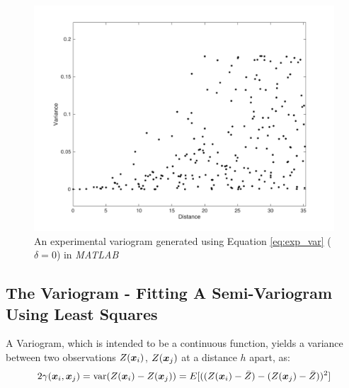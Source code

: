 \documentclass[11pt]{ucthesis}
\newcommand{\vect}[1]{{\it{\boldsymbol{#1}}}}
\begin{document}
\begin{figure}[H]
    \centering    
	\includegraphics[width=\linewidth]{figures/exp_variogram.png}
	\captionsetup{skip=0.5\baselineskip,size=footnotesize}
	\caption{An experimental variogram generated using Equation \ref{eq:exp_var} ($\delta=0$) in \textit{MATLAB}}
	\label{fig:exp_var}
\end{figure}

\subsection{The Variogram - Fitting A Semi-Variogram Using Least Squares}
A Variogram, which is intended to be a continuous function, yields a variance between two observations $Z(\vect{x}_{i})$, $Z(\vect{x}_{j})$ at a distance $h$ apart, as:
\begin{equation}
	2\gamma(\vect{x}_i, \vect{x}_j)= \text{var} (Z(\vect{x}_{i}) - Z(\vect{x}_{j}))=E[( (Z(\vect{x}_{i}) - \bar{Z} ) - (Z(\vect{x}_{j}) - \bar{Z} ))^2]
\end{equation}
\end{document}
